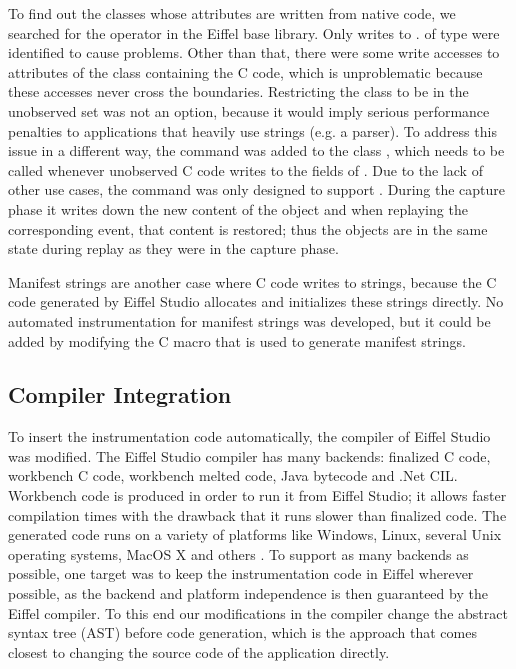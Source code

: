 To find out the classes whose attributes are written from native code, we searched for the \identifier{\$} operator in the Eiffel base library. Only writes to \hspace{0pt}. of type  were identified to cause problems. Other than that, there were some write accesses to attributes of the class containing the C code, which is unproblematic because these accesses never cross the boundaries.
Restricting the class  to be in the unobserved set was not an option, because it would imply serious performance penalties to applications that heavily use strings (e.g. a parser). To address this issue in a different way, the command  was added to the class , which needs to be called whenever unobserved C code writes to the fields of . Due to the lack of other use cases, the command was only designed to support . During the capture phase it writes down the new content of the object and when replaying the corresponding event, that content is restored; thus the objects are in the same state during replay as they were in the capture phase.

Manifest strings are another case where C code writes to strings, because the C code generated by Eiffel Studio allocates and initializes these strings directly. No automated instrumentation for manifest strings was developed, but it could be added by modifying the C macro that is used to generate manifest strings.


\subsection{Compiler Integration}
To insert the instrumentation code automatically, the compiler of Eiffel Studio was modified. The Eiffel Studio compiler has many backends: finalized C code, workbench C code, workbench melted code, Java bytecode and .Net CIL. Workbench code is produced in order to run it from Eiffel Studio; it allows faster compilation times with the drawback that it runs slower than finalized code. The generated code runs on a variety of platforms like Windows, Linux, several Unix operating systems, MacOS X and others \cite{eiffelsoftware}. To support as many backends as possible, one target was to keep the instrumentation code in Eiffel wherever possible, as the backend and platform independence is then guaranteed by the Eiffel compiler. To this end our modifications in the compiler change the abstract syntax tree (AST) before code generation, which is the approach that comes closest to changing the source code of the application directly.

